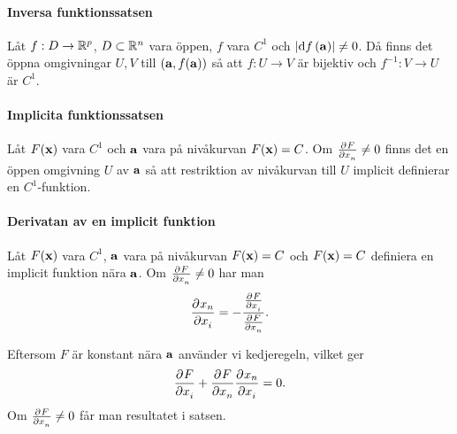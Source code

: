 \proof

\paragraph{Inversa funktionssatsen}
Låt $f: D\to\mathbb{R}^p$, $D\subset\mathbb{R}^n$ vara öppen, $f$ vara $C^1$ och $\abs{\dd{f} (\vb{a})}\neq 0$. Då finns det öppna omgivningar $U, V$ till $(\vb{a}, f(\vb{a}))$ så att $f:U\to V$ är bijektiv och $f^{-1}: V\to U$ är $C^1$.

\proof

\paragraph{Implicita funktionssatsen}
Låt $F(\vb{x})$ vara $C^1$ och $\vb{a}$ vara på nivåkurvan $F(\vb{x}) = C$. Om $\pdv[]{F}{x_n} (\vb{a})\neq 0$ finns det en öppen omgivning $U$ av $\vb{a}$ så att restriktion av nivåkurvan till $U$ implicit definierar en $C^1$-funktion.

\proof

\paragraph{Derivatan av en implicit funktion}
Låt $F(\vb{x})$ vara $C^1$, $\vb{a}$ vara på nivåkurvan $F(\vb{x}) = C$ och $F(\vb{x}) = C$ definiera en implicit funktion nära $\vb{a}$. Om $\pdv[]{F}{x_n} (\vb{a})\neq 0$ har man
\begin{align*}
	\pdv[]{x_n}{x_i} (\vb{a}') = -\frac{\pdv[]{F}{x_i} (\vb{a})}{\pdv[]{F}{x_n} (\vb{a})}.
\end{align*}

\proof
Eftersom $F$ är konstant nära $\vb{a}$ använder vi kedjeregeln, vilket ger
\begin{align*}
	\pdv[]{F}{x_i} (\vb{a}) + \pdv[]{F}{x_n} (\vb{a})\pdv[]{x_n}{x_i} (\vb{a}') = 0.
\end{align*}
Om $\pdv[]{F}{x_n} (\vb{a})\neq 0$ får man resultatet i satsen.